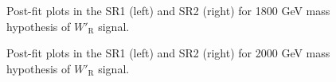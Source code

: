 \begin{figure}[H]
  \centering
  \caption{Post-fit plots in the SR1 (left) and SR2 (right) for 1800 GeV mass hypothesis of $W'_{\text{R}}$ signal.}
  \label{fig:Postfit_WpRH1800_Asimov}
\end{figure}
\begin{figure}[H]
  \centering
  \caption{Post-fit plots in the SR1 (left) and SR2 (right) for 2000 GeV mass hypothesis of $W'_{\text{R}}$ signal.}
  \label{fig:Postfit_WpRH2000_Asimov}
\end{figure}
